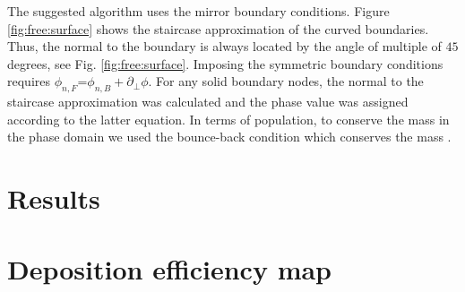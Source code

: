 \documentclass{article}
\begin{document}
The suggested algorithm uses the mirror boundary conditions. Figure \ref{fig:free:surface} shows the staircase approximation of the curved boundaries. 
Thus, the normal to the boundary is always located by the angle of multiple of $45$ degrees, see Fig. \ref{fig:free:surface}.  Imposing the
symmetric boundary conditions requires $\phi_{n,F}$=$\phi_{n,B}+\partial_{\perp} \phi$. For any solid boundary nodes, the normal to the staircase approximation was calculated and the phase value was assigned according to the latter equation.  In terms of population, to conserve the mass in the phase domain we used the bounce-back condition which conserves the mass \cite{yu}.  




\section{Results}

\section{Deposition efficiency map}
\end{document}

